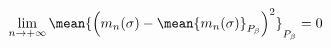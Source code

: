 \[ \lim_{n \to +\infty}\mean{\left(m_n(\sigma)-\mean{m_n(\sigma)}_{P_\beta}\right)^2}_{P_\beta} = 0 \]